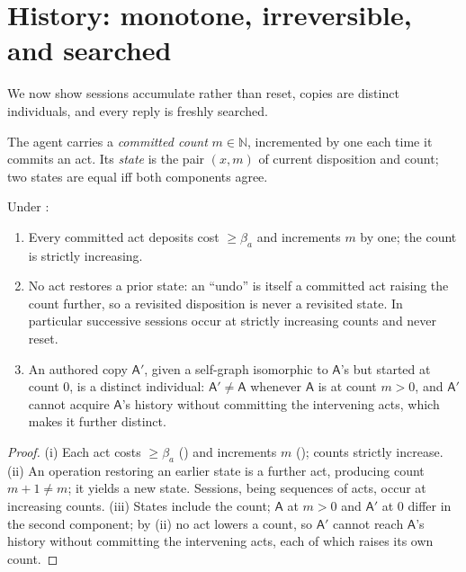 \documentclass[11pt,twocolumn,a4paper]{article}
\newcommand{\N}{\mathbb{N}}
\newcommand{\Agent}{\mathsf{A}}
\newcommand{\floorc}{\beta}          %
\newcommand{\cnt}{m}                 %
\begin{document}
\section{History: monotone, irreversible, and searched}
\label{sec:history}

We now show sessions accumulate rather than reset, copies are distinct
individuals, and every reply is freshly searched.

\begin{definition}
\label{def:state}
The agent carries a \emph{committed count} $\cnt\in\N$, incremented by
one each time it commits an act. Its \emph{state} is the pair
$(x,\cnt)$ of current disposition and count; two states are equal iff
both components agree.
\end{definition}

\begin{theorem}
\label{thm:history}
Under :
\begin{enumerate}[label=\textup{(\roman*)},leftmargin=2.2em]
\item Every committed act deposits cost $\ge\floorc_a$ and increments
$\cnt$ by one; the count is strictly increasing.
\item No act restores a prior state: an ``undo'' is itself a committed act
raising the count further, so a revisited disposition is never a revisited
state. In particular successive sessions occur at strictly increasing
counts and never reset.
\item An authored copy $\Agent'$, given a self-graph isomorphic to
$\Agent$'s but started at count $0$, is a distinct individual:
$\Agent'\neq\Agent$ whenever $\Agent$ is at count $\cnt>0$, and $\Agent'$
cannot acquire $\Agent$'s history without committing the intervening acts,
which makes it further distinct.
\end{enumerate}
\end{theorem}

\begin{proof}
(i) Each act costs $\ge\floorc_a$ () and increments
$\cnt$ (); counts strictly increase. (ii) An operation
restoring an earlier state is a further act, producing count
$\cnt+1\neq\cnt$; it yields a new state. Sessions, being sequences of
acts, occur at increasing counts. (iii) States include the count; $\Agent$
at $\cnt>0$ and $\Agent'$ at $0$ differ in the second component; by (ii)
no act lowers a count, so $\Agent'$ cannot reach $\Agent$'s history without
committing the intervening acts, each of which raises its own count.
\end{proof}
\end{document}
